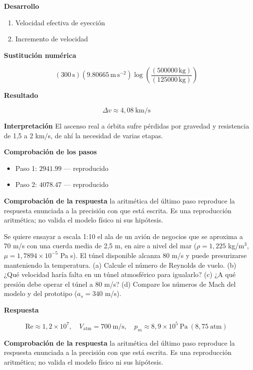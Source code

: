 \documentclass[10pt,openany]{book}
\begin{document}
\noindent\textbf{Desarrollo}
\begin{enumerate}
\item
Velocidad efectiva de eyección
\item
Incremento de velocidad
\end{enumerate}

\noindent\textbf{Sustitución numérica}

\[
\left(300\,\mathrm{s}\right) \left(9.80665\,\mathrm{m}\,\mathrm{s}^{-2}\right) \log{\left(\frac{\left(500000\,\mathrm{kg}\right)}{\left(125000\,\mathrm{kg}\right)} \right)}
\]

\noindent\textbf{Resultado}

\[
\Delta v \approx 4{,}08\ \mathrm{km/s}
\]

\noindent\textbf{Interpretación}
El ascenso real a órbita sufre pérdidas por gravedad y resistencia de 1,5 a 2 km/s, de ahí la necesidad de varias etapas.

\noindent\textbf{Comprobación de los pasos}
\begin{itemize}
\item Paso 1: $2941.99$ — reproducido
\item Paso 2: $4078.47$ — reproducido
\end{itemize}

\noindent\textbf{Comprobación de la respuesta} la aritmética del último paso reproduce la respuesta enunciada a la precisión con que está escrita. Es una reproducción aritmética; no valida el modelo físico ni sus hipótesis.

Se quiere ensayar a escala 1:10 el ala de un avión de negocios que se aproxima a 70 m/s con una cuerda media de 2,5 m, en aire a nivel del mar (\(\rho = 1{,}225\) kg/m\(^3\), \(\mu = 1{,}7894\times 10^{-5}\) Pa s). El túnel disponible alcanza 80 m/s y puede presurizarse manteniendo la temperatura. (a) Calcule el número de Reynolds de vuelo. (b) ¿Qué velocidad haría falta en un túnel atmosférico para igualarlo? (c) ¿A qué presión debe operar el túnel a 80 m/s? (d) Compare los números de Mach del modelo y del prototipo (\(a_s = 340\) m/s).

\noindent\textbf{Respuesta}

\[
\mathrm{Re} \approx 1{,}2\times 10^{7},\quad V_{\mathrm{atm}} = 700\ \mathrm{m/s},\quad p_m \approx 8{,}9\times 10^{5}\ \mathrm{Pa}\ (8{,}75\ \mathrm{atm})
\]

\noindent\textbf{Comprobación de la respuesta} la aritmética del último paso reproduce la respuesta enunciada a la precisión con que está escrita. Es una reproducción aritmética; no valida el modelo físico ni sus hipótesis.
\end{document}
